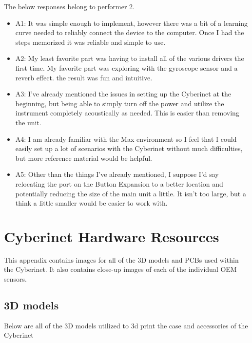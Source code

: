 The below responses belong to performer 2. %

\begin{itemize}
    \item A1: It was simple enough to implement, however there was a bit of a learning curve needed to reliably connect the device to the computer. Once I had the steps memorized it was reliable and simple to use.
    \item A2: My least favorite part was having to install all of the various drivers the first time. My favorite part was exploring with the gyroscope sensor and a reverb effect. the result was fun and intuitive.
    \item A3: I've already mentioned the issues in setting up the Cyberinet at the beginning, but being able to simply turn off the power and utilize the instrument completely acoustically as needed. This is easier than removing the unit.
    \item A4: I am already familiar with the Max environment so I feel that I could easily set up a lot of scenarios with the Cyberinet without much difficulties, but more reference material would be helpful. 
    \item A5: Other than the things I've already mentioned, I suppose I'd say relocating the port on the Button Expansion to a better location and potentially reducing the size of the main unit a little. It isn't too large, but a think a little smaller would be easier to work with.
\end{itemize}


\appendix

\chapter{Cyberinet Hardware Resources}
This appendix contains images for all of the 3D models and PCBs used within the Cyberinet. It also contains close-up images of each of the individual OEM sensors.

\section{3D models}
Below are all of the 3D models utilized to 3d print the case and accessories of the Cyberinet

